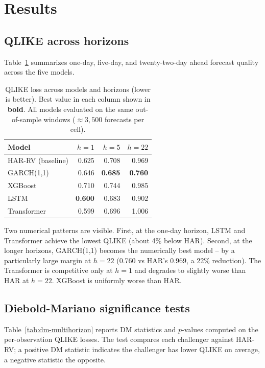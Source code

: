 \documentclass[11pt]{article}
\begin{document}
\section{Results}
\label{sec:results}

\subsection{QLIKE across horizons}

Table~\ref{tab:qlike-multihorizon} summarizes one-day, five-day,
and twenty-two-day ahead forecast quality across the five models.

\begin{table}[H]
\centering
\caption{QLIKE loss across models and horizons (lower is better).
Best value in each column shown in \textbf{bold}. All models
evaluated on the same out-of-sample windows ($\approx 3{,}500$
forecasts per cell).}
\label{tab:qlike-multihorizon}
\begin{tabular}{lrrr}
\toprule
Model       & $h=1$ & $h=5$ & $h=22$ \\
\midrule
HAR-RV (baseline) & 0.625 & 0.708 & 0.969 \\
GARCH(1,1)        & 0.646 & \textbf{0.685} & \textbf{0.760} \\
XGBoost           & 0.710 & 0.744 & 0.985 \\
LSTM              & \textbf{0.600} & 0.683 & 0.902 \\
Transformer       & 0.599 & 0.696 & 1.006 \\
\bottomrule
\end{tabular}
\end{table}

Two numerical patterns are visible. First, at the one-day horizon,
LSTM and Transformer achieve the lowest QLIKE (about 4\% below HAR).
Second, at the longer horizons, GARCH(1,1) becomes the numerically
best model -- by a particularly large margin at $h=22$
(0.760 vs HAR's 0.969, a 22\% reduction). The Transformer is
competitive only at $h=1$ and degrades to slightly worse than HAR
at $h=22$. XGBoost is uniformly worse than HAR.

\subsection{Diebold-Mariano significance tests}

Table~\ref{tab:dm-multihorizon} reports DM statistics and $p$-values
computed on the per-observation QLIKE losses. The test compares each
challenger against HAR-RV; a positive DM statistic indicates the
challenger has lower QLIKE on average, a negative statistic the
opposite.
\end{document}
